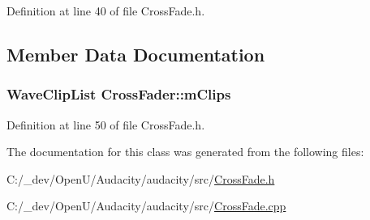 Definition at line 40 of file Cross\+Fade.\+h.



\subsection{Member Data Documentation}
\subsubsection[{\texorpdfstring{m\+Clips}{mClips}}]{\setlength{\rightskip}{0pt plus 5cm}Wave\+Clip\+List Cross\+Fader\+::m\+Clips\hspace{0.3cm}{\ttfamily [protected]}}\hypertarget{class_cross_fader_a98bf5101a9ebef7f9c002b2be45ff83d}{}\label{class_cross_fader_a98bf5101a9ebef7f9c002b2be45ff83d}


Definition at line 50 of file Cross\+Fade.\+h.



The documentation for this class was generated from the following files\+:\begin{DoxyCompactItemize}
\item 
C\+:/\+\_\+dev/\+Open\+U/\+Audacity/audacity/src/\hyperlink{_cross_fade_8h}{Cross\+Fade.\+h}\item 
C\+:/\+\_\+dev/\+Open\+U/\+Audacity/audacity/src/\hyperlink{_cross_fade_8cpp}{Cross\+Fade.\+cpp}\end{DoxyCompactItemize}
